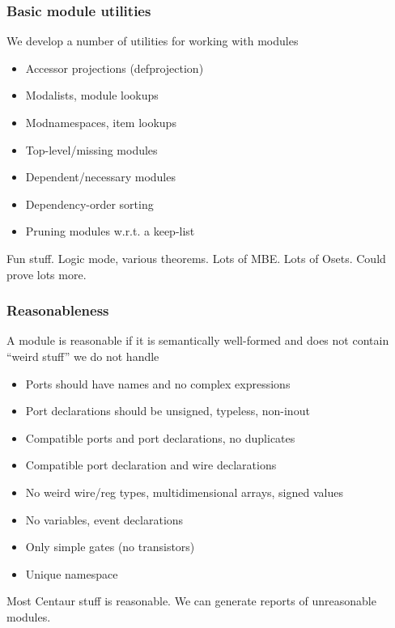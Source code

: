 \documentclass[mathserif]{beamer}
\newcommand{\Highlight}[1]{{\color{Highlight}#1}}
\begin{document}
\begin{frame}
\frametitle{Basic module utilities}

We develop a number of utilities for working with modules
\begin{itemize}
\item Accessor projections (defprojection)
\item Modalists, module lookups
\item Modnamespaces, item lookups
\item Top-level/missing modules
\item Dependent/necessary modules
\item Dependency-order sorting
\item Pruning modules w.r.t. a keep-list
\end{itemize}

\bigskip
Fun stuff.  Logic mode, various theorems.  Lots of MBE.  Lots of Osets.
Could prove lots more.

\end{frame}


\begin{frame}
\frametitle{Reasonableness}

A module is \Highlight{reasonable} if it is semantically well-formed 
and does not contain ``weird stuff'' we do not handle
\begin{itemize}
\item Ports should have names and no complex expressions
\item Port declarations should be unsigned, typeless, non-inout
\item Compatible ports and port declarations, no duplicates
\item Compatible port declaration and wire declarations
\item No weird wire/reg types, multidimensional arrays, signed values
\item No variables, event declarations
\item Only simple gates (no transistors) 
\item Unique namespace
\end{itemize}

\bigskip
\Highlight{Most} Centaur stuff is reasonable.  We can generate reports of unreasonable
modules.
\end{frame}
\end{document}

